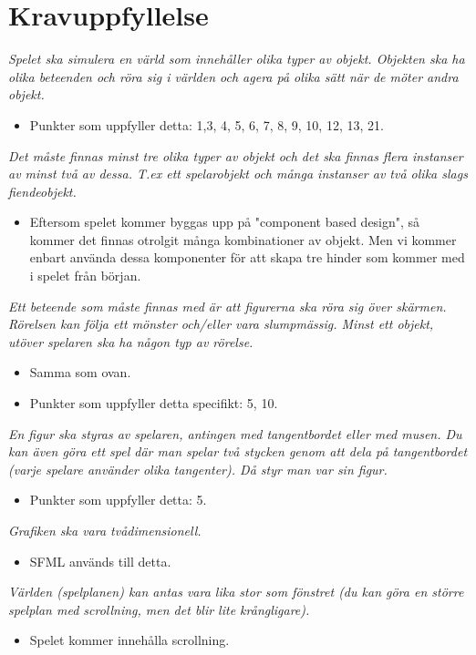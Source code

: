 \documentclass{template}
\begin{document}
\section{Kravuppfyllelse}
\textit{Spelet ska simulera en värld som innehåller olika typer av objekt. Objekten ska ha olika beteenden och röra sig i världen och agera på olika sätt när de möter andra objekt.}
\begin{itemize}
    \item Punkter som uppfyller detta: 1,3, 4, 5, 6, 7, 8, 9, 10, 12, 13, 21.
\end{itemize} 
\textit{Det måste finnas minst tre olika typer av objekt och det ska finnas flera instanser av minst två av dessa. T.ex ett spelarobjekt och många instanser av två olika slags fiendeobjekt.}
\begin{itemize}
    \item Eftersom spelet kommer byggas upp på "component based design", så kommer det finnas otrolgit många kombinationer av objekt. Men vi kommer enbart använda dessa komponenter för att skapa tre hinder som kommer med i spelet från början. 
\end{itemize}
\textit{Ett beteende som måste finnas med är att figurerna ska röra sig över skärmen. Rörelsen kan följa ett mönster och/eller vara slumpmässig. Minst ett objekt, utöver spelaren ska ha någon typ av rörelse.}
\begin{itemize}
    \item Samma som ovan.
    \item Punkter som uppfyller detta specifikt: 5, 10.
\end{itemize}
\textit{En figur ska styras av spelaren, antingen med tangentbordet eller med musen. Du kan även göra ett spel där man spelar två stycken genom att dela på tangentbordet (varje spelare använder olika tangenter). Då styr man var sin figur.}
\begin{itemize}
    \item Punkter som uppfyller detta: 5.
\end{itemize}
\textit{Grafiken ska vara tvådimensionell.}
\begin{itemize}
    \item SFML används till detta.
\end{itemize}
\textit{Världen (spelplanen) kan antas vara lika stor som fönstret (du kan göra en större spelplan med scrollning, men det blir lite krångligare).}
\begin{itemize}
    \item Spelet kommer innehålla scrollning.
\end{itemize}
\end{document}
